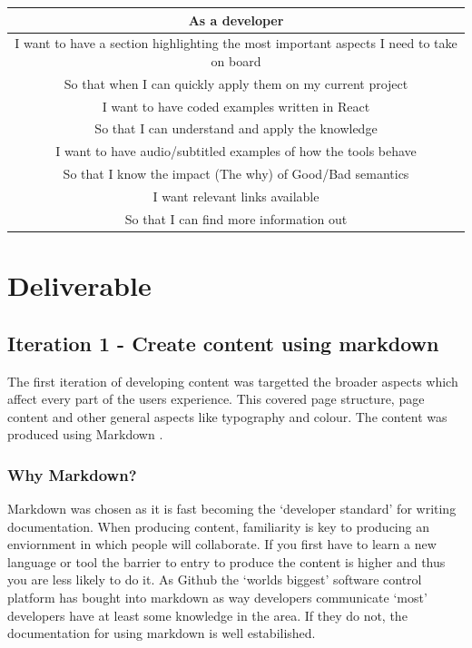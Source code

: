\begin{center}
 \begin{tabular}{| c |}
 \hline
 As a developer \\
 \hline
 I want to have a section highlighting the most important aspects I need to
 take on board \\
 So that when I can quickly apply them on my current project \\
 \hline
 I want to have coded examples written in React \\
 So that I can understand and apply the knowledge \\
 \hline
 I want to have audio/subtitled examples of how the tools behave  \\
 So that I know the impact (The why) of Good/Bad semantics  \\
 \hline
 I want relevant links available  \\
 So that I can find more information out  \\
 \hline
\end{tabular}
\end{center}

\section{Deliverable}
\subsection{Iteration 1 - Create content using markdown}
The first iteration of developing content was targetted the broader aspects
which affect every part of the users experience. This covered page structure,
page content and other general aspects like typography and colour. The content was produced
using Markdown \citep{Markdown}.

\subsubsection{Why Markdown?}
Markdown was chosen as it is fast becoming the `developer standard' for writing
documentation. When producing content, familiarity is key to producing an
enviornment in which people will collaborate. If you first have to
learn a new language or tool the barrier to entry to produce the content is
higher and thus you are less likely to do it. As Github the `worlds biggest'
\citep{GithubBig} software control platform has bought into markdown as way
developers communicate `most' developers have at least some knowledge in the
area. If they do not, the documentation for using markdown is well estabilished.

